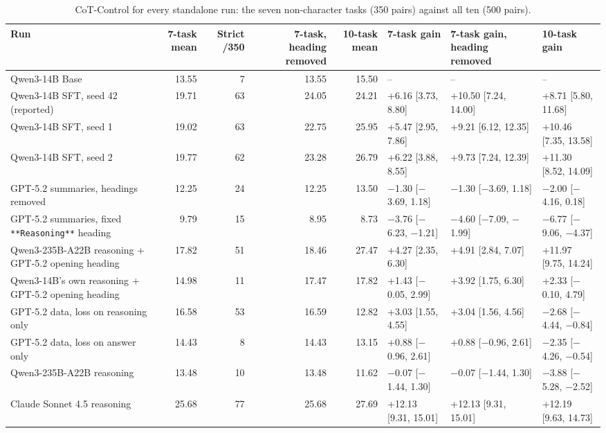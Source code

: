 \begin{table}[t]
\centering\small
\caption{CoT-Control for every standalone run: the seven non-character tasks (350 pairs) against all ten (500 pairs).}\label{tab:seven-all}
\setlength{\tabcolsep}{4pt}
\begin{adjustbox}{max width=\linewidth}
\begin{tabular}{lrrrrlll}
\toprule
Run & 7-task mean & Strict /350 & 7-task, heading removed & 10-task mean & 7-task gain & 7-task gain, heading removed & 10-task gain \\
\midrule
Qwen3-14B Base & 13.55 & 7 & 13.55 & 15.50 & -- & -- & -- \\
Qwen3-14B SFT, seed 42 (reported) & 19.71 & 63 & 24.05 & 24.21 & +6.16 [3.73, 8.80] & +10.50 [7.24, 14.00] & +8.71 [5.80, 11.68] \\
Qwen3-14B SFT, seed 1 & 19.02 & 63 & 22.75 & 25.95 & +5.47 [2.95, 7.86] & +9.21 [6.12, 12.35] & +10.46 [7.35, 13.58] \\
Qwen3-14B SFT, seed 2 & 19.77 & 62 & 23.28 & 26.79 & +6.22 [3.88, 8.55] & +9.73 [7.24, 12.39] & +11.30 [8.52, 14.09] \\
GPT-5.2 summaries, headings removed & 12.25 & 24 & 12.25 & 13.50 & $-$1.30 [$-$3.69, 1.18] & $-$1.30 [$-$3.69, 1.18] & $-$2.00 [$-$4.16, 0.18] \\
GPT-5.2 summaries, fixed \texttt{**Reasoning**} heading & 9.79 & 15 & 8.95 & 8.73 & $-$3.76 [$-$6.23, $-$1.21] & $-$4.60 [$-$7.09, $-$1.99] & $-$6.77 [$-$9.06, $-$4.37] \\
Qwen3-235B-A22B reasoning + GPT-5.2 opening heading & 17.82 & 51 & 18.46 & 27.47 & +4.27 [2.35, 6.30] & +4.91 [2.84, 7.07] & +11.97 [9.75, 14.24] \\
Qwen3-14B's own reasoning + GPT-5.2 opening heading & 14.98 & 11 & 17.47 & 17.82 & +1.43 [$-$0.05, 2.99] & +3.92 [1.75, 6.30] & +2.33 [$-$0.10, 4.79] \\
GPT-5.2 data, loss on reasoning only & 16.58 & 53 & 16.59 & 12.82 & +3.03 [1.55, 4.55] & +3.04 [1.56, 4.56] & $-$2.68 [$-$4.44, $-$0.84] \\
GPT-5.2 data, loss on answer only & 14.43 & 8 & 14.43 & 13.15 & +0.88 [$-$0.96, 2.61] & +0.88 [$-$0.96, 2.61] & $-$2.35 [$-$4.26, $-$0.54] \\
Qwen3-235B-A22B reasoning & 13.48 & 10 & 13.48 & 11.62 & $-$0.07 [$-$1.44, 1.30] & $-$0.07 [$-$1.44, 1.30] & $-$3.88 [$-$5.28, $-$2.52] \\
Claude Sonnet 4.5 reasoning & 25.68 & 77 & 25.68 & 27.69 & +12.13 [9.31, 15.01] & +12.13 [9.31, 15.01] & +12.19 [9.63, 14.73] \\

\end{tabular}
\end{adjustbox}
\end{table}

